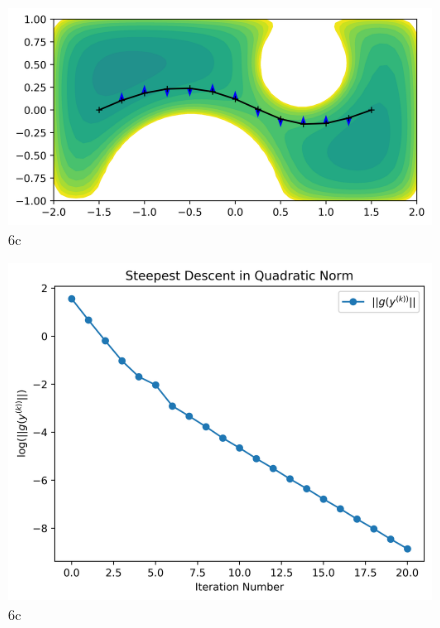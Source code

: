 \documentclass{article}
\begin{document}
\clearpage

\begin{figure}[!ht]
    \centering
    \includegraphics[scale=0.8]{fig4.png}
    \caption{6c}
\end{figure}

\begin{figure}[!ht]
    \centering
    \includegraphics[scale=0.8]{fig5.png}
    \caption{6c}
\end{figure}
\end{document}
